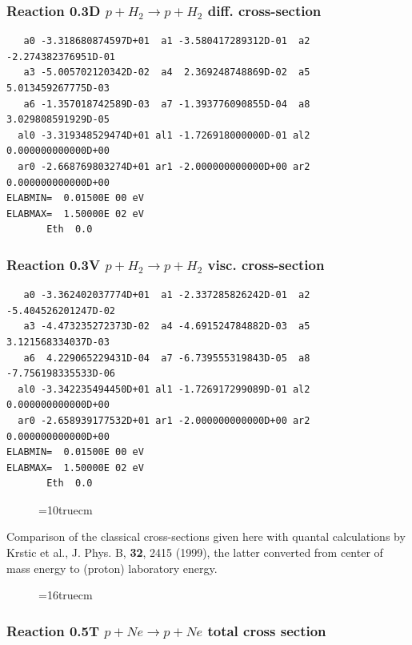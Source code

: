 \documentclass[12pt,dvipdfmx]{article}
\begin{document}
\subsubsection{
Reaction 0.3D   $ p + H_2 \rightarrow p + H_2 $  diff. cross-section
}
\begin{small}\begin{verbatim}
   a0 -3.318680874597D+01  a1 -3.580417289312D-01  a2 -2.274382376951D-01
   a3 -5.005702120342D-02  a4  2.369248748869D-02  a5  5.013459267775D-03
   a6 -1.357018742589D-03  a7 -1.393776090855D-04  a8  3.029808591929D-05
  al0 -3.319348529474D+01 al1 -1.726918000000D-01 al2  0.000000000000D+00
  ar0 -2.668769803274D+01 ar1 -2.000000000000D+00 ar2  0.000000000000D+00
ELABMIN=  0.01500E 00 eV
ELABMAX=  1.50000E 02 eV
       Eth  0.0
\end{verbatim}\end{small}

\subsubsection{
Reaction 0.3V   $  p + H_2 \rightarrow p + H_2  $ visc. cross-section
}
\begin{small}\begin{verbatim}
   a0 -3.362402037774D+01  a1 -2.337285826242D-01  a2 -5.404526201247D-02
   a3 -4.473235272373D-02  a4 -4.691524784882D-03  a5  3.121568334037D-03
   a6  4.229065229431D-04  a7 -6.739555319843D-05  a8 -7.756198335533D-06
  al0 -3.342235494450D+01 al1 -1.726917299089D-01 al2  0.000000000000D+00
  ar0 -2.658939177532D+01 ar1 -2.000000000000D+00 ar2  0.000000000000D+00
ELABMIN=  0.01500E 00 eV
ELABMAX=  1.50000E 02 eV
       Eth  0.0
\end{verbatim}\end{small}

\begin{figure}[hb] \label{0.3a}
\epsfxsize=10truecm
\end{figure}
Comparison of the classical cross-sections given here with quantal calculations
by Krstic et al., J. Phys. B, \textbf{32}, 2415 (1999), the latter converted from center of mass energy to (proton) laboratory energy.
\clearpage
\newpage

\begin{figure} \label{0.3}
\epsfxsize=16truecm
\end{figure}
\newpage



\subsubsection{
Reaction 0.5T   $ p + Ne \rightarrow p + Ne $ total cross
section }
\end{document}
